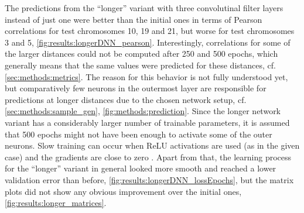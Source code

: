 The predictions from the ``longer'' variant with three convolutinal filter layers instead of just one were better than the initial ones in terms of
Pearson correlations for test chromosomes 10, 19 and 21, but worse for test chromosomes 3 and 5, \cref{fig:results:longerDNN_pearson}.
Interestingly, correlations for some of the larger distances could not be computed after 250 and 500 epochs, 
which generally means that the same values were predicted for these distances, cf. \cref{sec:methods:metrics}.
The reason for this behavior is not fully understood yet, but comparatively few neurons in the outermost layer are responsible for predictions at 
longer distances due to the chosen network setup, cf. \cref{sec:methods:sample_gen}, \cref{fig:methods:prediction}.
Since the longer network variant has a considerably larger number of trainable parameters,
it is assumed that 500 epochs might not have been enough to activate some of the outer neurons.
Slow training can occur when ReLU activations are used (as in the given case) and the gradients are close to zero \cite{Maas2013}.
Apart from that, the learning process for the ``longer'' variant in general looked more smooth and reached a lower validation error than before, \cref{fig:results:longerDNN_lossEpochs},
but the matrix plots did not show any obvious improvement over the initial ones, \cref{fig:results:longer_matrices}.
